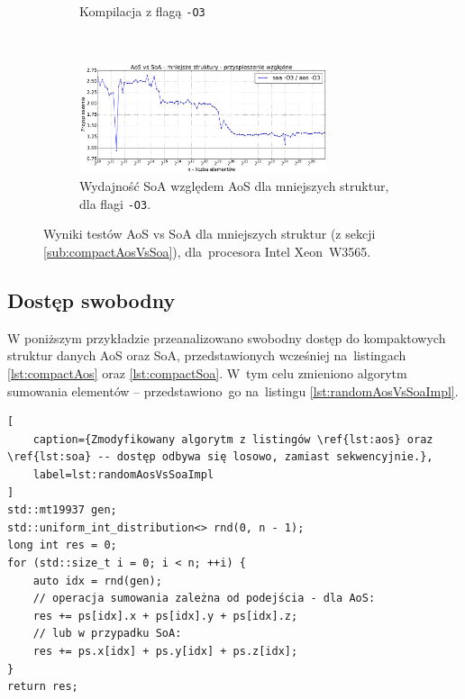 \begin{figure}
\begin{subfigure}[c]{0.45\textwidth}
        \caption{Kompilacja z flagą \texttt{-O3}}
    \end{subfigure}
    \\
    \vspace{0.55cm}
    \begin{subfigure}[c]{1.0\textwidth}
        \centering
        \includegraphics[width=0.80\textwidth]{images/benchs_xeon/compact_aos_vs_soa_normalized}
        \caption{Wydajność SoA względem AoS dla mniejszych struktur, dla flagi \texttt{-O3}.}
        \label{fig:compactAosVsSoaRelativeXeon}
    \end{subfigure}
    \caption{Wyniki testów AoS vs SoA dla mniejszych struktur (z sekcji \ref{sub:compactAosVsSoa}), dla~procesora Intel \mbox{Xeon W3565}.}
    \label{fig:compactAosLayoutXeon}
\end{figure}

\clearpage

\subsection{Dostęp swobodny}
\label{sub:randomAosVsSoa}

W poniższym przykładzie przeanalizowano swobodny dostęp do kompaktowych struktur danych AoS oraz SoA, przedstawionych wcześniej na~listingach \ref{lst:compactAos} oraz \ref{lst:compactSoa}. W~tym celu zmieniono algorytm sumowania elementów -- przedstawiono~go na~listingu \ref{lst:randomAosVsSoaImpl}.

\begin{lstlisting}[
    caption={Zmodyfikowany algorytm z listingów \ref{lst:aos} oraz \ref{lst:soa} -- dostęp odbywa się losowo, zamiast sekwencyjnie.},
    label=lst:randomAosVsSoaImpl
]
std::mt19937 gen;
std::uniform_int_distribution<> rnd(0, n - 1);
long int res = 0;
for (std::size_t i = 0; i < n; ++i) {
    auto idx = rnd(gen);
    // operacja sumowania zależna od podejścia - dla AoS:
    res += ps[idx].x + ps[idx].y + ps[idx].z;
    // lub w przypadku SoA:
    res += ps.x[idx] + ps.y[idx] + ps.z[idx];
}
return res;
\end{lstlisting}

